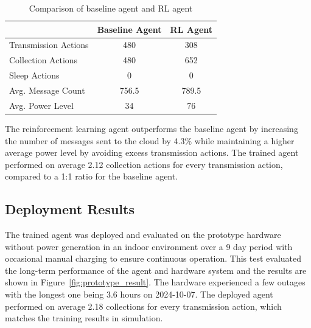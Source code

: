 \documentclass[10pt]{cai}
\begin{document}
\begin{table}[h]
  \centering
  \caption{Comparison of baseline agent and RL agent}
  \begin{tabular}{lcc}
      \toprule
      & Baseline Agent & RL Agent \\
      \midrule
      Transmission Actions & 480 & 308 \\
      Collection Actions & 480 & 652 \\
      Sleep Actions & 0 & 0 \\
      Avg. Message Count & 756.5 & 789.5 \\
      Avg. Power Level & 34 & 76 \\
      \bottomrule
  \end{tabular}
  \label{tab:agent_comparison}
\end{table}

The reinforcement learning agent outperforms the baseline agent by increasing the number of messages sent to the cloud by 4.3\% while maintaining a higher average power level by avoiding excess transmission actions.
The trained agent performed on average 2.12 collection actions for every transmission action, compared to a 1:1 ratio for the baseline agent.

\subsection{Deployment Results}

The trained agent was deployed and evaluated on the prototype hardware without power generation in an indoor environment over a 9 day period with occasional manual charging to ensure continuous operation.
This test evaluated the long-term performance of the agent and hardware system and the results are shown in Figure~\ref{fig:prototype_result}.
The hardware experienced a few outages with the longest one being 3.6 hours on 2024-10-07.
The deployed agent performed on average 2.18 collections for every transmission action, which matches the training results in simulation.
\end{document}
